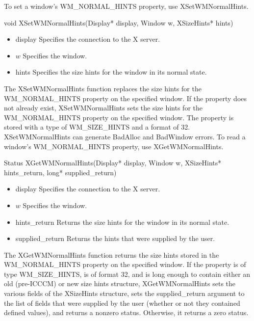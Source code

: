 \documentclass{report}
\begin{document}
\begin{itemize}
\begin{itemize}
            \bigbreak \noindent 
            To set a window’s WM\_NORMAL\_HINTS property, use XSetWMNormalHints.
            \bigbreak \noindent 
            \begin{cppcode}
                void XSetWMNormalHints(Display* display, Window w, XSizeHints* hints)
            \end{cppcode}
            \bigbreak \noindent
            \begin{itemize}
                \item display Specifies the connection to the X server.
                \item $w$ Specifies the window.
                \item hints Specifies the size hints for the window in its normal state.
            \end{itemize}
            The XSetWMNormalHints function replaces the size hints for the WM\_NORMAL\_HINTS property on the specified window. If the property does not already exist, XSetWMNormalHints sets the size hints for the WM\_NORMAL\_HINTS property on the specified window. The property is stored with a type of WM\_SIZE\_HINTS and a format of 32.
            \bigbreak \noindent 
            XSetWMNormalHints can generate BadAlloc and BadWindow errors.
            \bigbreak \noindent 
            To read a window’s WM\_NORMAL\_HINTS property, use XGetWMNormalHints.
            \bigbreak \noindent 
            \begin{cppcode}
            Status XGetWMNormalHints(Display* display, Window w, XSizeHints* hints_return, long* supplied_return)
            \end{cppcode}
            \bigbreak \noindent
            \begin{itemize}
                \item display Specifies the connection to the X server.
                \item $w$ Specifies the window.
                \item hints\_return Returns the size hints for the window in its normal state.
                \item supplied\_return Returns the hints that were supplied by the user.
            \end{itemize}
            The XGetWMNormalHints function returns the size hints stored in the WM\_NORMAL\_HINTS property on the specified window. If the property is of type WM\_SIZE\_HINTS, is of format 32, and is long enough to contain either an old (pre-ICCCM) or new size hints structure, XGetWMNormalHints sets the various fields of the XSizeHints structure, sets the supplied\_return argument to the list of fields that were supplied by the user (whether or not they contained defined values), and returns a nonzero status. Otherwise, it returns a zero status.

\end{itemize}
\end{itemize}
\end{document}
